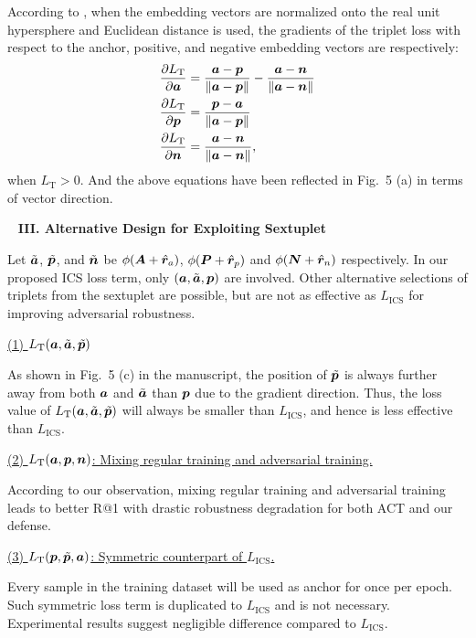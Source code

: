 According to \cite{robrank}, when the embedding vectors are normalized onto the
real unit hypersphere and Euclidean distance is used, the gradients of the
triplet loss with respect to the anchor, positive, and negative embedding
vectors are respectively:
%
\begin{align}
%
	\frac{\partial L_\text{T}}{\partial \va} &= \frac{\va - \vp}{\|\va - \vp\|}
	- \frac{\va - \vn}{\| \va - \vn \|} \\
	\frac{\partial L_\text{T}}{\partial \vp} &= \frac{\vp - \va}{\|\va - \vp\|} \\
	\frac{\partial L_\text{T}}{\partial \vn} &= \frac{\va - \vn}{\|\va - \vn\|},
%
\end{align}
%
when $L_\text{T}>0$.
And the above equations have been reflected in Fig.~5 (a) in terms of vector direction.

~\newline
\noindent\textbf{III. Alternative Design for Exploiting Sextuplet}

Let $\tilde{{\bm{a}}}$, $\tilde{{\bm{p}}}$, and $\tilde{{\bm{n}}}$ be $\phi({\bm{A}}+\hat{{\bm{r}}}_a)$,
$\phi({\bm{P}}+\hat{{\bm{r}}}_p)$ and $\phi({\bm{N}}+\hat{{\bm{r}}}_n)$ respectively.
%
In our proposed ICS loss term, only $({\bm{a}}, \tilde{{\bm{a}}}, {\bm{p}})$ are involved.
%
Other alternative selections of triplets from the sextuplet are possible,
but are not as effective as $L_\text{ICS}$ for improving adversarial robustness.

\ul{(1) $L_\text{T}({\bm{a}}, \tilde{{\bm{a}}}, \tilde{{\bm{p}}})$}

As shown in Fig.~5 (c) in the manuscript, the position of $\tilde{{\bm{p}}}$ is
always further away from both ${\bm{a}}$ and $\tilde{{\bm{a}}}$ than ${\bm{p}}$ due to
the gradient direction.
%
Thus, the loss value of $L_\text{T}({\bm{a}}, \tilde{{\bm{a}}}, \tilde{{\bm{p}}})$ will always
be smaller than $L_\text{ICS}$, and hence is less effective than $L_\text{ICS}$.

\ul{(2) $L_\text{T}({\bm{a}}, {\bm{p}}, {\bm{n}})$: Mixing regular training
and adversarial training.}

According to our observation, mixing regular training and adversarial training
leads to better R@1 with drastic robustness degradation for both ACT and
our defense.

\ul{(3) $L_\text{T}({\bm{p}}, \tilde{{\bm{p}}}, {\bm{a}})$: Symmetric counterpart of $L_\text{ICS}$.}

Every sample in the training dataset will be used as anchor for once per
epoch.
%
Such symmetric loss term is duplicated to $L_\text{ICS}$ and is
not necessary.
%
Experimental results suggest negligible difference compared to $L_\text{ICS}$.

